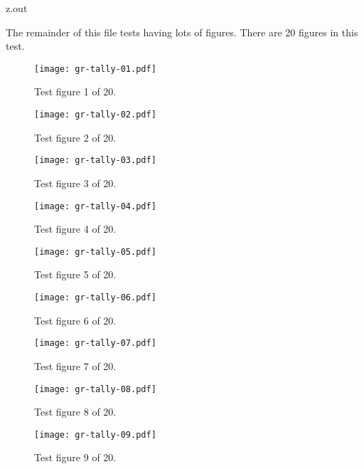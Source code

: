 \begin{VerbatimOut}{z.out}

\newpage

The remainder of this file tests having lots of figures.
There are 20 figures in this test.

\begin{figure}[ht]
  \centering
  \texttt{[image: gr-tally-01.pdf]}
  \caption{Test figure 1 of 20.}
  \label{fi:1of20}
\end{figure}

\begin{figure}[ht]
  \centering
  \texttt{[image: gr-tally-02.pdf]}
  \caption{Test figure 2 of 20.}
  \label{fi:2of20}
\end{figure}

\begin{figure}[ht]
  \centering
  \texttt{[image: gr-tally-03.pdf]}
  \caption{Test figure 3 of 20.}
  \label{fi:3of20}
\end{figure}

\begin{figure}[ht]
  \centering
  \texttt{[image: gr-tally-04.pdf]}
  \caption{Test figure 4 of 20.}
  \label{fi:4of20}
\end{figure}

\begin{figure}[ht]
  \centering
  \texttt{[image: gr-tally-05.pdf]}
  \caption{Test figure 5 of 20.}
  \label{fi:5of20}
\end{figure}

\begin{figure}[ht]
  \centering
  \texttt{[image: gr-tally-06.pdf]}
  \caption{Test figure 6 of 20.}
  \label{fi:6of20}
\end{figure}

\begin{figure}[ht]
  \centering
  \texttt{[image: gr-tally-07.pdf]}
  \caption{Test figure 7 of 20.}
  \label{fi:7of20centered7}
\end{figure}

\begin{figure}[ht]
  \centering
  \texttt{[image: gr-tally-08.pdf]}
  \caption{Test figure 8 of 20.}
  \label{fi:8of20}
\end{figure}

\begin{figure}[ht]
  \centering
  \texttt{[image: gr-tally-09.pdf]}
  \caption{Test figure 9 of 20.}
  \label{fi:9of20}
\end{figure}


\end{VerbatimOut}
